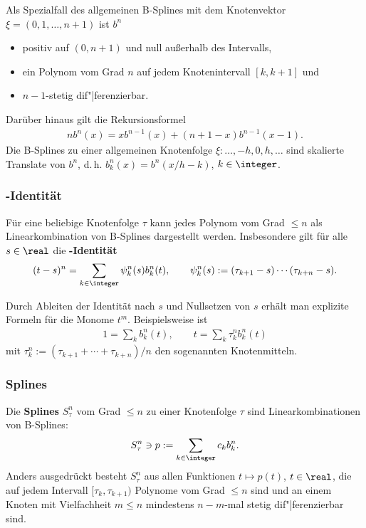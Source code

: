 Als Spezialfall des allgemeinen B-Splines mit dem Knotenvektor
$\xi = (0, 1, \dotsc, n + 1)$ ist $b^n$
\begin{itemize}
    \item
    positiv auf $(0, n + 1)$ und null außerhalb des Intervalls,
    
    \item
    ein Polynom vom Grad $n$ auf jedem Knotenintervall $[k, k + 1]$ und
    
    \item
    $n - 1$-stetig dif"|ferenzierbar.
\end{itemize}
Darüber hinaus gilt die Rekursionsformel
\begin{align*}
    n b^n(x) = x b^{n-1}(x) + (n + 1 - x) b^{n-1}(x - 1).
\end{align*}
Die B-Splines zu einer allgemeinen Knotenfolge
$\xi\colon \dotsc, -h, 0, h, \dotsc$
sind skalierte Translate von $b^n$, d.\,h. $b_k^n(x) = b^n(x/h - k)$,
$k \in \integer$.

\subsubsection{%
    -Identität%
}

Für eine beliebige Knotenfolge $\tau$ kann jedes Polynom vom Grad $\le n$
als Linearkombination von B-Splines dargestellt werden.
Insbesondere gilt für alle $s \in \real$ die \textbf{-Identität}
\begin{align*}
    (t - s)^n = \sum_{k \in \integer} \psi_k^n(s) b_k^n(t), \qquad
    \psi_k^n(s) := (\tau_{k+1} - s) \dotsm (\tau_{k+n} - s).
\end{align*}

Durch Ableiten der Identität nach $s$ und Nullsetzen von $s$ erhält man
explizite Formeln für die Monome $t^m$.
Beispielsweise ist
\begin{align*}
    1 = \sum_k b_k^n(t), \qquad
    t = \sum_k \tau_k^n b_k^n(t)
\end{align*}
mit $\tau_k^n := (\tau_{k+1} + \dotsb + \tau_{k+n}) / n$ den sogenannten
Knotenmitteln.

\subsubsection{%
    Splines%
}

Die \textbf{Splines} $S_\tau^n$ vom Grad $\le n$ zu einer Knotenfolge $\tau$
sind Linearkombinationen von B-Splines:
\begin{align*}
    S_\tau^n \ni p := \sum_{k \in \integer} c_k b_k^n.
\end{align*}
Anders ausgedrückt besteht $S_\tau^n$ aus allen Funktionen $t \mapsto p(t)$,
$t \in \real$, die auf jedem Intervall $[\tau_k, \tau_{k+1})$ Polynome
vom Grad $\le n$ sind und an einem Knoten mit Vielfachheit $m \le n$
mindestens $n - m$-mal stetig dif"|ferenzierbar sind.

